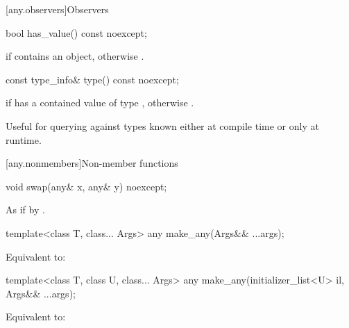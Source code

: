 [any.observers]{Observers}

%
\begin{itemdecl}
bool has_value() const noexcept;
\end{itemdecl}

\begin{itemdescr}
\pnum
\returns
{} if  contains an object, otherwise .
\end{itemdescr}

%
\begin{itemdecl}
const type_info& type() const noexcept;
\end{itemdecl}

\begin{itemdescr}
\pnum
\returns
{} if  has a contained value of type ,
otherwise .

\pnum
\begin{note}
Useful for querying against types known either at compile time or only at runtime.
\end{note}
\end{itemdescr}

[any.nonmembers]{Non-member functions}

%
\begin{itemdecl}
void swap(any& x, any& y) noexcept;
\end{itemdecl}

\begin{itemdescr}
\pnum
\effects
As if by .
\end{itemdescr}

%
\begin{itemdecl}
template<class T, class... Args>
  any make_any(Args&& ...args);
\end{itemdecl}

\begin{itemdescr}
\pnum
\effects
Equivalent to: 
\end{itemdescr}

%
\begin{itemdecl}
template<class T, class U, class... Args>
  any make_any(initializer_list<U> il, Args&& ...args);
\end{itemdecl}

\begin{itemdescr}
\pnum
\effects
Equivalent to: 
\end{itemdescr}

